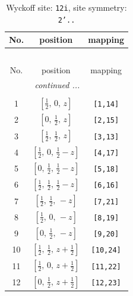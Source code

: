 \documentclass[fleqn,8pt]{jsarticle}
\begin{document}
\begin{longtable}{ccc}
\caption{Wyckoff site: {\tt 12i}, site symmetry: {\tt 2'..}}
 \\
 \hline \hline
No. & position & mapping \\ \hline \endfirsthead

\multicolumn{2}{l}{\tablename\ \thetable{}} \\
 \hline \hline
No. & position & mapping \\ \hline \endhead

 \hline \hline
\multicolumn{2}{r}{\footnotesize\it continued ...} \\ \endfoot

 \hline \hline
\multicolumn{2}{r}{} \\ \endlastfoot

1 & $\left[ \frac{1}{2},\, 0,\, z \right]$ & {\tt [1,14]} \\ \hline
2 & $\left[ 0,\, \frac{1}{2},\, z \right]$ & {\tt [2,15]} \\ \hline
3 & $\left[ \frac{1}{2},\, \frac{1}{2},\, z \right]$ & {\tt [3,13]} \\ \hline
4 & $\left[ \frac{1}{2},\, 0,\, \frac{1}{2} - z \right]$ & {\tt [4,17]} \\ \hline
5 & $\left[ 0,\, \frac{1}{2},\, \frac{1}{2} - z \right]$ & {\tt [5,18]} \\ \hline
6 & $\left[ \frac{1}{2},\, \frac{1}{2},\, \frac{1}{2} - z \right]$ & {\tt [6,16]} \\ \hline
7 & $\left[ \frac{1}{2},\, \frac{1}{2},\, - z \right]$ & {\tt [7,21]} \\ \hline
8 & $\left[ \frac{1}{2},\, 0,\, - z \right]$ & {\tt [8,19]} \\ \hline
9 & $\left[ 0,\, \frac{1}{2},\, - z \right]$ & {\tt [9,20]} \\ \hline
10 & $\left[ \frac{1}{2},\, \frac{1}{2},\, z + \frac{1}{2} \right]$ & {\tt [10,24]} \\ \hline
11 & $\left[ \frac{1}{2},\, 0,\, z + \frac{1}{2} \right]$ & {\tt [11,22]} \\ \hline
12 & $\left[ 0,\, \frac{1}{2},\, z + \frac{1}{2} \right]$ & {\tt [12,23]} \\
\end{longtable}
\renewcommand{\arraystretch}{1.2}
\end{document}
